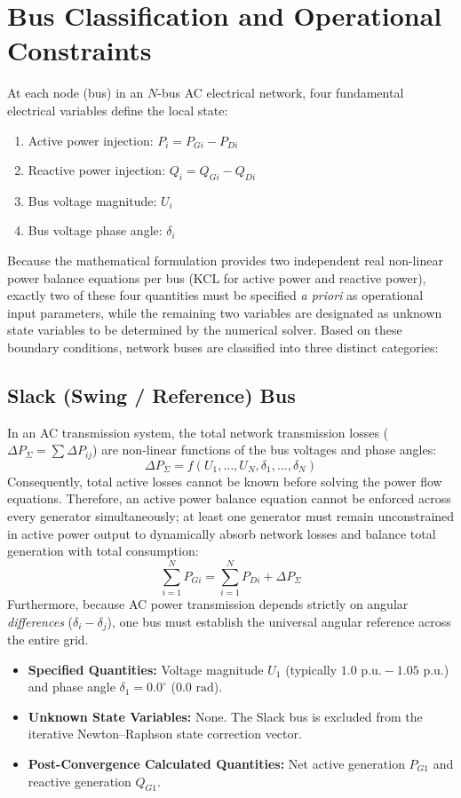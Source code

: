 \documentclass[12pt,a4paper,oneside]{report}
\begin{document}
\section{Bus Classification and Operational Constraints}
At each node (bus) in an $N$-bus AC electrical network, four fundamental electrical variables define the local state:
\begin{enumerate}
    \item Active power injection: $P_i = P_{Gi} - P_{Di}$
    \item Reactive power injection: $Q_i = Q_{Gi} - Q_{Di}$
    \item Bus voltage magnitude: $U_i$
    \item Bus voltage phase angle: $\delta_i$
\end{enumerate}

Because the mathematical formulation provides two independent real non-linear power balance equations per bus (KCL for active power and reactive power), exactly two of these four quantities must be specified \textit{a priori} as operational input parameters, while the remaining two variables are designated as unknown state variables to be determined by the numerical solver. Based on these boundary conditions, network buses are classified into three distinct categories:

\subsection{Slack (Swing / Reference) Bus}
In an AC transmission system, the total network transmission losses ($\Delta P_{\Sigma} = \sum \Delta P_{ij}$) are non-linear functions of the bus voltages and phase angles:
\begin{equation}
\Delta P_{\Sigma} = f(U_1, \dots, U_N, \delta_1, \dots, \delta_N)
\end{equation}
Consequently, total active losses cannot be known before solving the power flow equations. Therefore, an active power balance equation cannot be enforced across every generator simultaneously; at least one generator must remain unconstrained in active power output to dynamically absorb network losses and balance total generation with total consumption:
\begin{equation}
\sum_{i=1}^N P_{Gi} = \sum_{i=1}^N P_{Di} + \Delta P_{\Sigma}
\end{equation}
Furthermore, because AC power transmission depends strictly on angular \textit{differences} ($\delta_i - \delta_j$), one bus must establish the universal angular reference across the entire grid.
\begin{itemize}
    \item \textbf{Specified Quantities:} Voltage magnitude $U_1$ (typically $1.0\text{ p.u.} - 1.05\text{ p.u.}$) and phase angle $\delta_1 = 0.0^\circ$ ($0.0\text{ rad}$).
    \item \textbf{Unknown State Variables:} None. The Slack bus is excluded from the iterative Newton--Raphson state correction vector.
    \item \textbf{Post-Convergence Calculated Quantities:} Net active generation $P_{G1}$ and reactive generation $Q_{G1}$.
\end{itemize}
\end{document}
